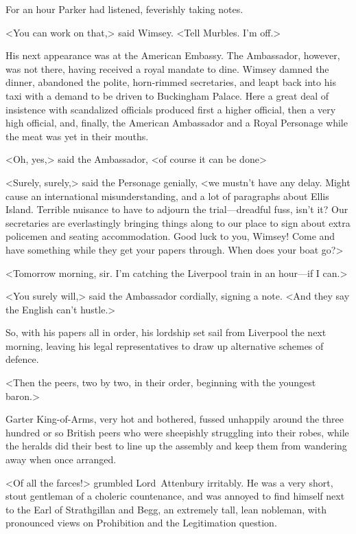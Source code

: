 For an hour Parker had listened, feverishly taking notes.

<You can work on that,> said Wimsey. <Tell Murbles. I'm off.>

His next appearance was at the American Embassy. The Ambassador, however, was not there, having received a royal mandate to dine. Wimsey damned the dinner, abandoned the polite, horn-rimmed secretaries, and leapt back into his taxi with a demand to be driven to Buckingham Palace. Here a great deal of insistence with scandalized officials produced first a higher official, then a very high official, and, finally, the American Ambassador and a Royal Personage while the meat was yet in their mouths.

<Oh, yes,> said the Ambassador, <of course it can be done\longdash>

<Surely, surely,> said the Personage genially, <we mustn't have any delay. Might cause an international misunderstanding, and a lot of paragraphs about Ellis Island. Terrible nuisance to have to adjourn the trial—dreadful fuss, isn't it? Our secretaries are everlastingly bringing things along to our place to sign about extra policemen and seating accommodation. Good luck to you, Wimsey! Come and have something while they get your papers through. When does your boat go?>

<Tomorrow morning, sir. I'm catching the Liverpool train in an hour—if I can.>

<You surely will,> said the Ambassador cordially, signing a note. <And they say the English can't hustle.>

So, with his papers all in order, his lordship set sail from Liverpool the next morning, leaving his legal representatives to draw up alternative schemes of defence. 

\divider

<Then the peers, two by two, in their order, beginning with the youngest baron.>

Garter King-of-Arms, very hot and bothered, fussed unhappily around the three hundred or so British peers who were sheepishly struggling into their robes, while the heralds did their best to line up the assembly and keep them from wandering away when once arranged.

<Of all the farces!> grumbled Lord~Attenbury irritably. He was a very short, stout gentleman of a choleric countenance, and was annoyed to find himself next to the Earl of Strathgillan and Begg, an extremely tall, lean nobleman, with pronounced views on Prohibition and the Legitimation question.

